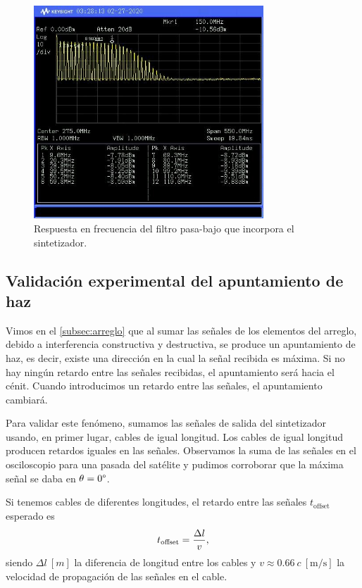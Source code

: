 \documentclass{article}
\newenvironment{standalone}{\begin{preview}}{\end{preview}}
\begin{document}
\begin{standalone}
  \begin{figure}[!htbp]
    \centering
    \includegraphics[width=\linewidth, height=80mm, keepaspectratio]{../images/filtro-dds.jpg}
    \caption{Respuesta en frecuencia del filtro pasa-bajo que incorpora el sintetizador.}
    \label{fig:filtro-dds}
  \end{figure}

  \subsection{Validación experimental del apuntamiento de haz}

  Vimos en el \cref{subsec:arreglo} que al sumar las señales de los elementos del arreglo, debido a interferencia constructiva y destructiva, se produce un apuntamiento de haz, es decir, existe una dirección en la cual la señal recibida es máxima.
  Si no hay ningún retardo entre las señales recibidas, el apuntamiento será hacia el cénit.
  Cuando introducimos un retardo entre las señales, el apuntamiento cambiará.

  Para validar este fenómeno, sumamos las señales de salida del sintetizador usando, en primer lugar, cables de igual longitud.
  Los cables de igual longitud producen retardos iguales en las señales.
  Observamos la suma de las señales en el osciloscopio para una pasada del satélite y pudimos corroborar que la máxima señal se daba en $\theta = 0\degree$.


  Si tenemos cables de diferentes longitudes, el retardo entre las señales $t_{\text{offset}}$ esperado es
  \begin{equation}
    t_{\text{offset}} = \frac{\Delta l}{v},
    \tagaddtext{[\si{\second}]}
  \end{equation}
  siendo $\Delta l \ [\si{m}]$ la diferencia de longitud entre los cables y $v \approx 0.66 \ c\ [\si{\meter\per\second}]$ la velocidad de propagación de las señales en el cable.


\end{standalone}
\end{document}
